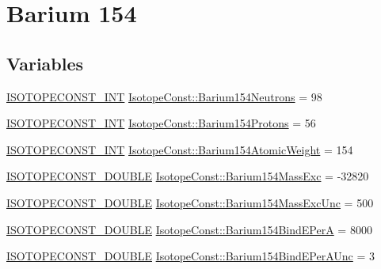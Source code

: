 \hypertarget{group___isotope_const-_barium-_ba154}{}\section{Barium 154}
\label{group___isotope_const-_barium-_ba154}
\subsection*{Variables}
\begin{DoxyCompactItemize}
\item 
\mbox{\hyperlink{group___isotope_const-_macros_ga5f18360b3e99483a35c32d789e62621c}{I\+S\+O\+T\+O\+P\+E\+C\+O\+N\+S\+T\+\_\+\+I\+NT}} \mbox{\hyperlink{group___isotope_const-_barium-_ba154_ga5ed94c06f3c67444ed63ea377807ea2f}{Isotope\+Const\+::\+Barium154\+Neutrons}} = 98
\item 
\mbox{\hyperlink{group___isotope_const-_macros_ga5f18360b3e99483a35c32d789e62621c}{I\+S\+O\+T\+O\+P\+E\+C\+O\+N\+S\+T\+\_\+\+I\+NT}} \mbox{\hyperlink{group___isotope_const-_barium-_ba154_gaf2b1119a2ebf016da7472475ec15b243}{Isotope\+Const\+::\+Barium154\+Protons}} = 56
\item 
\mbox{\hyperlink{group___isotope_const-_macros_ga5f18360b3e99483a35c32d789e62621c}{I\+S\+O\+T\+O\+P\+E\+C\+O\+N\+S\+T\+\_\+\+I\+NT}} \mbox{\hyperlink{group___isotope_const-_barium-_ba154_ga6399d40f80ddaa60b9e30e8e5bd1778f}{Isotope\+Const\+::\+Barium154\+Atomic\+Weight}} = 154
\item 
\mbox{\hyperlink{group___isotope_const-_macros_ga8f45a7272ce02c0b4c65c44636ed719a}{I\+S\+O\+T\+O\+P\+E\+C\+O\+N\+S\+T\+\_\+\+D\+O\+U\+B\+LE}} \mbox{\hyperlink{group___isotope_const-_barium-_ba154_gab4167d862b95ea282dd817561a0d3355}{Isotope\+Const\+::\+Barium154\+Mass\+Exc}} = -\/32820
\item 
\mbox{\hyperlink{group___isotope_const-_macros_ga8f45a7272ce02c0b4c65c44636ed719a}{I\+S\+O\+T\+O\+P\+E\+C\+O\+N\+S\+T\+\_\+\+D\+O\+U\+B\+LE}} \mbox{\hyperlink{group___isotope_const-_barium-_ba154_gac5088a0bf2b08c27303252908a873cdf}{Isotope\+Const\+::\+Barium154\+Mass\+Exc\+Unc}} = 500
\item 
\mbox{\hyperlink{group___isotope_const-_macros_ga8f45a7272ce02c0b4c65c44636ed719a}{I\+S\+O\+T\+O\+P\+E\+C\+O\+N\+S\+T\+\_\+\+D\+O\+U\+B\+LE}} \mbox{\hyperlink{group___isotope_const-_barium-_ba154_ga3f83527df957ce95c0ed9fcb5db63d6c}{Isotope\+Const\+::\+Barium154\+Bind\+E\+PerA}} = 8000
\item 
\mbox{\hyperlink{group___isotope_const-_macros_ga8f45a7272ce02c0b4c65c44636ed719a}{I\+S\+O\+T\+O\+P\+E\+C\+O\+N\+S\+T\+\_\+\+D\+O\+U\+B\+LE}} \mbox{\hyperlink{group___isotope_const-_barium-_ba154_ga091f08f97b1da3a710993f5d456e74fc}{Isotope\+Const\+::\+Barium154\+Bind\+E\+Per\+A\+Unc}} = 3

\end{DoxyCompactItemize}
